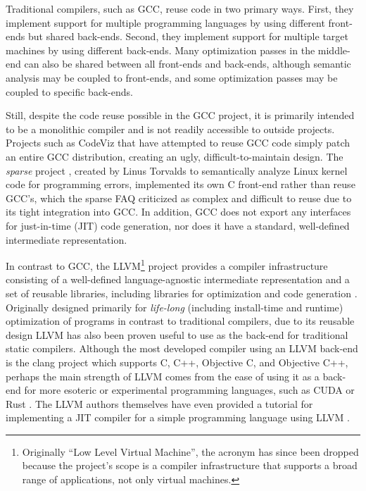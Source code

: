 \documentclass[11pt]{article}
\begin{document}
Traditional compilers, such as GCC, reuse code in two primary ways.  First, they
implement support for multiple programming languages by using different
front-ends but shared back-ends.  Second, they implement support for multiple
target machines by using different back-ends.  Many optimization passes in the
middle-end can also be shared between all front-ends and back-ends, although
semantic analysis may be coupled to front-ends, and some optimization passes may
be coupled to specific back-ends.

Still, despite the code reuse possible in the GCC project, it is primarily
intended to be a monolithic compiler and is not readily accessible to outside
projects.  Projects such as CodeViz \cite{codeviz} that have attempted to reuse
GCC code simply patch an entire GCC distribution, creating an ugly,
difficult-to-maintain design.  The {\em sparse} project \cite{sparse}, created
by Linus Torvalds to semantically analyze Linux kernel code for programming
errors, implemented its own C front-end rather than reuse GCC's, which the
sparse FAQ criticized as complex and difficult to reuse due to its tight
integration into GCC.  In addition, GCC does not export any interfaces for
just-in-time (JIT) code generation, nor does it have a standard, well-defined
intermediate representation.

In contrast to GCC, the LLVM\footnote{Originally ``Low Level Virtual Machine'',
the acronym has since been dropped because the project's scope is a compiler
infrastructure that supports a broad range of applications, not only virtual
machines.} project provides a compiler infrastructure consisting of a
well-defined language-agnostic intermediate representation and a set of reusable
libraries, including libraries for optimization and code generation
\cite{lattner2004llvm}.  Originally designed primarily for {\em life-long}
(including install-time and runtime) optimization of programs in contrast to
traditional compilers, due to its reusable design LLVM has also been proven
useful to use as the back-end for traditional static compilers.  Although the
most developed compiler using an LLVM back-end is the clang project which
supports C, C++, Objective C, and Objective C++, perhaps the main strength of
LLVM comes from the ease of using it as a back-end for more esoteric or
experimental programming languages, such as CUDA \cite{nvidia_llvm} or Rust
\cite{rust}.  The LLVM authors themselves have even provided a tutorial for
implementing a JIT compiler for a simple programming language using LLVM
\cite{kaleidoscope}.
\end{document}
